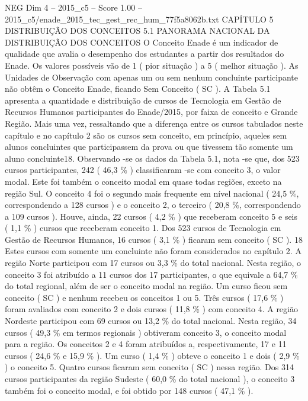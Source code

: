 \begin{textsample}{NEG Dim 4 – 2015\_c5 – Score 1.00 – 2015\_c5/enade\_2015\_tec\_gest\_rec\_hum\_77f5a8062b.txt}  \label{ex:f4_neg_183}
CAPÍTULO 5 DISTRIBUIÇÃO DOS CONCEITOS 5.1 PANORAMA NACIONAL DA DISTRIBUIÇÃO DOS CONCEITOS O Conceito Enade é um indicador de qualidade que avalia o desempenho dos estudantes a partir dos resultados do Enade.
Os valores possíveis vão de 1 ( pior situação ) a 5 ( melhor situação ).
As Unidades de Observação com apenas um ou sem nenhum concluinte participante não obtêm o Conceito Enade, ficando Sem Conceito ( SC ).
A Tabela 5.1 apresenta a quantidade e distribuição de cursos de Tecnologia em Gestão de Recursos Humanos participantes do Enade/2015, por faixa de conceito e Grande Região.
Mais uma vez, ressaltando que a diferença entre os cursos tabulados neste capítulo e no capítulo 2 são os cursos sem conceito, em princípio, aqueles sem alunos concluintes que participassem da prova ou que tivessem tão somente um aluno concluinte18.
Observando -se os dados da Tabela 5.1, nota -se que, dos 523 cursos participantes, 242 ( 46,3 \% ) classificaram -se com conceito 3, o valor modal.
Este foi também o conceito modal em quase todas regiões, exceto na região Sul.
O conceito 4 foi o segundo mais frequente em nível nacional ( 24,5 \%, correspondendo a 128 cursos ) e o conceito 2, o terceiro ( 20,8 \%, correspondendo a 109 cursos ).
Houve, ainda, 22 cursos ( 4,2 \% ) que receberam conceito 5 e seis ( 1,1 \% ) cursos que receberam conceito 1.
Dos 523 cursos de Tecnologia em Gestão de Recursos Humanos, 16 cursos ( 3,1 \% ) ficaram sem conceito ( SC ). 18 Estes cursos com somente um concluinte não foram considerados no capítulo 2.
A região Norte participou com 17 cursos ou 3,3 \% do total nacional.
Nesta região, o conceito 3 foi atribuído a 11 cursos dos 17 participantes, o que equivale a 64,7 \% do total regional, além de ser o conceito modal na região.
Um curso ficou sem conceito ( SC ) e nenhum recebeu os conceitos 1 ou 5.
Três cursos ( 17,6 \% ) foram avaliados com conceito 2 e dois cursos ( 11,8 \% ) com conceito 4.
A região Nordeste participou com 69 cursos ou 13,2 \% do total nacional.
Nesta região, 34 cursos ( 49,3 \% em termos regionais ) obtiveram conceito 3, o conceito modal para a região.
Os conceitos 2 e 4 foram atribuídos a, respectivamente, 17 e 11 cursos ( 24,6 \% e 15,9 \% ).
Um curso ( 1,4 \% ) obteve o conceito 1 e dois ( 2,9 \% ) o conceito 5.
Quatro cursos ficaram sem conceito ( SC ) nessa região.
Dos 314 cursos participantes da região Sudeste ( 60,0 \% do total nacional ), o conceito 3 também foi o conceito modal, e foi obtido por 148 cursos ( 47,1 \% ).

\end{textsample}

